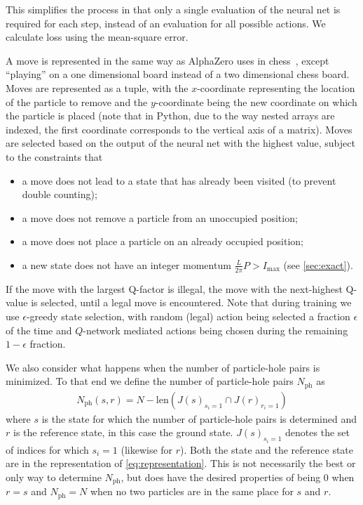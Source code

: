 \documentclass[11pt, a4paper]{report} %
\begin{document}
This simplifies the process in that only a single evaluation of the neural net is required for each step, instead of an evaluation for all possible actions.
We calculate loss using the mean-square error.

A move is represented in the same way as AlphaZero uses in chess~\cite{Silver2017}, except ``playing'' on a one dimensional board instead of a two dimensional chess board.
Moves are represented as a tuple, with the \(x\)-coordinate representing the location of the particle to remove and the \(y\)-coordinate being the new coordinate on which the particle is placed (note that in Python, due to the way nested arrays are indexed, the first coordinate corresponds to the vertical axis of a matrix).
Moves are selected based on the output of the neural net with the highest value, subject to the constraints that
\begin{itemize}
\item a move does not lead to a state that has already been visited (to prevent double counting);
\item a move does not remove a particle from an unoccupied position;
\item a move does not place a particle on an already occupied position;
\item a new state does not have an integer momentum \(\frac{L}{2\pi}P > I_{\max}\) (see \cref{sec:exact}).
\end{itemize}
If the move with the largest Q-factor is illegal, the move with the next-highest Q-value is selected, until a legal move is encountered.
Note that during training we use \(\epsilon\)-greedy state selection, with random (legal) action being selected a fraction \(\epsilon\) of the time and \(Q\)-network mediated actions being chosen during the remaining \(1-\epsilon\) fraction.

We also consider what happens when the number of particle-hole pairs is minimized.
To that end we define the number of particle-hole pairs \(N_{\mathrm{ph}}\) as
\begin{align}
  \label{eq:52}
  N_{\mathrm{ph}}(s, r) = N - \mathrm{len}(J(s)_{s_i=1}\cap J(r)_{r_i=1}) 
\end{align}
where \(s\) is the state for which the number of particle-hole pairs is determined and \(r\) is the reference state, in this case the ground state.
\(J(s)_{s_i=1}\) denotes the set of indices for which \(s_i = 1\) (likewise for \(r\)).
Both the state and the reference state are in the representation of \cref{eq:representation}.
This is not necessarily the best or only way to determine \(N_{\mathrm{ph}}\), but does have the desired properties of being 0 when \(r=s\) and \(N_{\mathrm{ph}} = N\) when no two particles are in the same place for \(s\) and \(r\).
\end{document}
